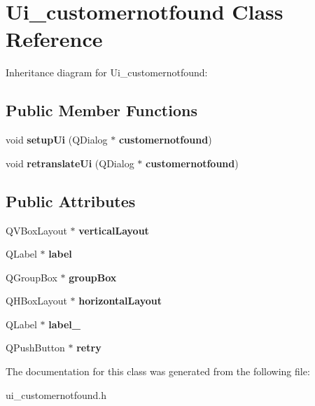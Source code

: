\section{Ui\+\_\+customernotfound Class Reference}
\label{class_ui__customernotfound}


Inheritance diagram for Ui\+\_\+customernotfound\+:
\subsection*{Public Member Functions}
\begin{DoxyCompactItemize}
\item 
\mbox{\label{class_ui__customernotfound_a0ecfd8ccdeb089dcb811da26d40cf59f}} 
void {\bfseries setup\+Ui} (Q\+Dialog $\ast$\textbf{ customernotfound})
\item 
\mbox{\label{class_ui__customernotfound_aad087905155a84d086cfe28a300aadce}} 
void {\bfseries retranslate\+Ui} (Q\+Dialog $\ast$\textbf{ customernotfound})
\end{DoxyCompactItemize}
\subsection*{Public Attributes}
\begin{DoxyCompactItemize}
\item 
\mbox{\label{class_ui__customernotfound_a8d3b8240c1787041c019d43963deac96}} 
Q\+V\+Box\+Layout $\ast$ {\bfseries vertical\+Layout}
\item 
\mbox{\label{class_ui__customernotfound_ac00035763a5a056459531c61a5921a61}} 
Q\+Label $\ast$ {\bfseries label}
\item 
\mbox{\label{class_ui__customernotfound_aab7b53fede588a206e3e5e090985c248}} 
Q\+Group\+Box $\ast$ {\bfseries group\+Box}
\item 
\mbox{\label{class_ui__customernotfound_a9135983a05ae74d2c5f3c7a009131bf2}} 
Q\+H\+Box\+Layout $\ast$ {\bfseries horizontal\+Layout}
\item 
\mbox{\label{class_ui__customernotfound_a25e50bcf172555eccfe6ef57cd46fff1}} 
Q\+Label $\ast$ {\bfseries label\+\_}
\item 
\mbox{\label{class_ui__customernotfound_a28dbe53388e7a9cd24dd20bafbf5ae27}} 
Q\+Push\+Button $\ast$ {\bfseries retry}
\end{DoxyCompactItemize}


The documentation for this class was generated from the following file\+:\begin{DoxyCompactItemize}
\item 
ui\+\_\+customernotfound.\+h\end{DoxyCompactItemize}
